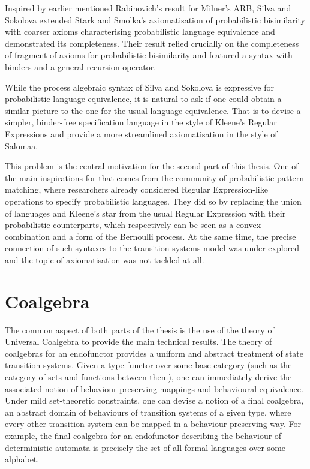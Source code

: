 Inspired by earlier mentioned Rabinovich's result for Milner's ARB, Silva and Sokolova extended Stark and Smolka's axiomatisation of probabilistic bisimilarity with coarser axioms characterising probabilistic language equivalence and demonstrated its completeness. Their result relied crucially on the completeness of fragment of axioms for probabilistic bisimilarity and featured a syntax with binders and a general recursion operator.

While the process algebraic syntax of Silva and Sokolova is expressive for probabilistic language equivalence, it is natural to ask if one could obtain a similar picture to the one for the usual language equivalence. That is to devise a simpler, binder-free specification language in the style of Kleene's Regular Expressions and provide a more streamlined axiomatisation in the style of Salomaa.
	
	This problem is the central motivation for the second part of this thesis. One of the main inspirations for that comes from the community of probabilistic pattern matching, where researchers already considered Regular Expression-like operations to specify probabilistic languages. They did so by replacing the union of languages and Kleene's star from the usual Regular Expression with their probabilistic counterparts, which respectively can be seen as a convex combination and a form of the Bernoulli process. At the same time, the precise connection of such syntaxes to the transition systems model was under-explored and the topic of axiomatisation was not tackled at all. 


\section{Coalgebra}
The common aspect of both parts of the thesis is the use of the theory of Universal Coalgebra to provide the main technical results. The theory of coalgebras for an endofunctor provides a uniform and abstract treatment of state transition systems. Given a type functor over some base category (such as the category of sets and functions between them), one can immediately derive the associated notion of behaviour-preserving mappings and behavioural equivalence. Under mild set-theoretic constraints, one can devise a notion of a final coalgebra, an abstract domain of behaviours of transition systems of a given type, where every other transition system can be mapped in a behaviour-preserving way. For example, the final coalgebra for an endofunctor describing the behaviour of deterministic automata is precisely the set of all formal languages over some alphabet.

